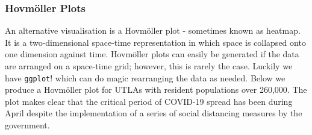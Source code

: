 \documentclass[
]{book}
\begin{document}
\hypertarget{hovmuxf6ller-plots}{%
\subsubsection{Hovmöller Plots}\label{hovmuxf6ller-plots}}

An alternative visualisation is a Hovmöller plot - sometimes known as heatmap. It is a two-dimensional space-time representation in which space is collapsed onto one dimension against time. Hovmöller plots can easily be generated if the data are arranged on a space-time grid; however, this is rarely the case. Luckily we have \texttt{ggplot}! which can do magic rearranging the data as needed. Below we produce a Hovmöller plot for UTLAs with resident populations over 260,000. The plot makes clear that the critical period of COVID-19 spread has been during April despite the implementation of a series of social distancing measures by the government.
\end{document}

